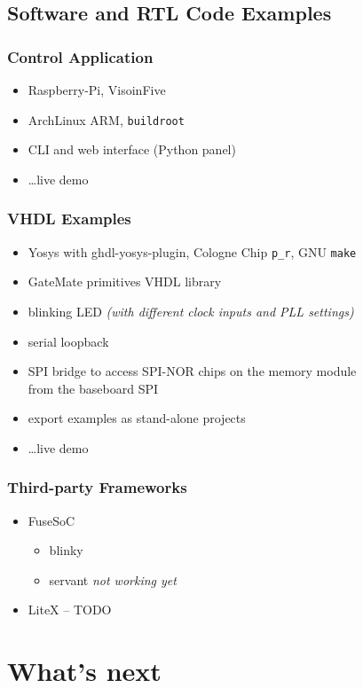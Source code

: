 \subsection{Software and RTL Code Examples}

\begin{frame}
  \frametitle{Control Application}
  \begin{itemize}
  \item Raspberry-Pi, VisoinFive
  \item ArchLinux ARM, \texttt{buildroot}
  \item CLI and web interface (Python panel)
  \item \dots live demo
  \end{itemize}
\end{frame}

\begin{frame}
  \frametitle{VHDL Examples}
  \begin{itemize}
  \item Yosys with ghdl-yosys-plugin, Cologne Chip \texttt{p\_r},
  GNU \texttt{make}
  \item GateMate primitives VHDL library
  \item blinking LED \textit{(with different clock inputs and PLL
  settings)}
  \item serial loopback
  \item SPI bridge to access SPI-NOR chips on the memory module\\
  from the baseboard SPI
  \item export examples as stand-alone projects
  \item \dots live demo
  \end{itemize}
\end{frame}

\begin{frame}
  \frametitle{Third-party Frameworks}
  \begin{itemize}
    \item FuseSoC
    \begin{itemize}
      \item blinky
      \item servant \textit{not working yet}
    \end{itemize}
    \item LiteX -- TODO
  \end{itemize}
\end{frame}

\section{What's next}

